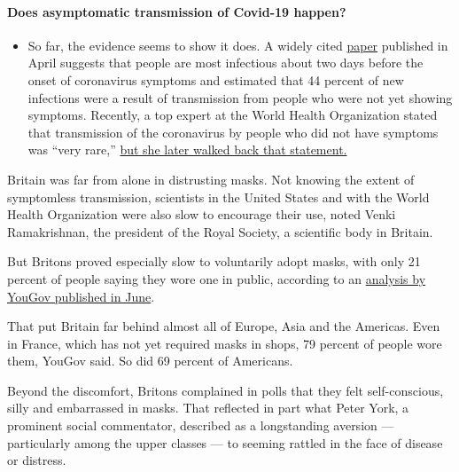 \begin{itemize}
{  \paragraph{Does asymptomatic transmission of Covid-19
  happen?}\label{does-asymptomatic-transmission-of-covid-19-happen}}

  \begin{itemize}
  \tightlist
  \item
    So far, the evidence seems to show it does. A widely cited
    \href{https://www.nature.com/articles/s41591-020-0869-5}{paper}
    published in April suggests that people are most infectious about
    two days before the onset of coronavirus symptoms and estimated that
    44 percent of new infections were a result of transmission from
    people who were not yet showing symptoms. Recently, a top expert at
    the World Health Organization stated that transmission of the
    coronavirus by people who did not have symptoms was ``very rare,''
    \href{https://www.nytimes.com/2020/06/09/world/coronavirus-updates.html?action=click\&pgtype=Article\&state=default\&region=MAIN_CONTENT_3\&context=storylines_faq\#link-1f302e21}{but
    she later walked back that statement.}
  \end{itemize}
\end{itemize}

Britain was far from alone in distrusting masks. Not knowing the extent
of symptomless transmission, scientists in the United States and with
the World Health Organization were also slow to encourage their use,
noted Venki Ramakrishnan, the president of the Royal Society, a
scientific body in Britain.

But Britons proved especially slow to voluntarily adopt masks, with only
21 percent of people saying they wore one in public, according to an
\href{https://yougov.co.uk/topics/health/articles-reports/2020/06/04/covid-19-britons-still-wont-wear-face-masks}{analysis
by YouGov published in June}.

That put Britain far behind almost all of Europe, Asia and the Americas.
Even in France, which has not yet required masks in shops, 79 percent of
people wore them, YouGov said. So did 69 percent of Americans.

Beyond the discomfort, Britons complained in polls that they felt
self-conscious, silly and embarrassed in masks. That reflected in part
what Peter York, a prominent social commentator, described as a
longstanding aversion --- particularly among the upper classes --- to
seeming rattled in the face of disease or distress.

